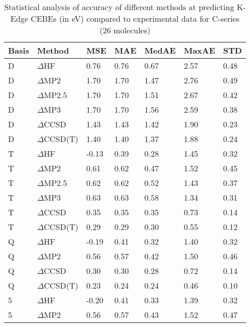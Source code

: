 \begin{table}
  \caption{Statistical analysis of accuracy of different methods at predicting K-Edge CEBEs (in eV) compared to experimental data for C-series (26 molecules)}
  \label{tbl:summary-c}
  \begin{tabular}{l l l l l l l }
    \toprule
    \textbf{Basis} & \textbf{Method} & \textbf{MSE} & \textbf{MAE} & \textbf{MedAE} & \textbf{MaxAE} & \textbf{STD} \\ 
    \midrule
    D & $\Delta$HF & 0.76 & 0.76 & 0.67 & 2.57 & 0.48 \\ 
    D & $\Delta$MP2 & 1.70 & 1.70 & 1.47 & 2.76 & 0.49 \\ 
    D & $\Delta$MP2.5 & 1.70 & 1.70 & 1.51 & 2.67 & 0.42 \\ 
    D & $\Delta$MP3 & 1.70 & 1.70 & 1.56 & 2.59 & 0.38 \\ 
    D & $\Delta$CCSD & 1.43 & 1.43 & 1.42 & 1.90 & 0.23 \\ 
    D & $\Delta$CCSD(T) & 1.40 & 1.40 & 1.37 & 1.88 & 0.24 \\ 
    T & $\Delta$HF & -0.13 & 0.39 & 0.28 & 1.45 & 0.32 \\ 
    T & $\Delta$MP2 & 0.61 & 0.62 & 0.47 & 1.52 & 0.45 \\ 
    T & $\Delta$MP2.5 & 0.62 & 0.62 & 0.52 & 1.43 & 0.37 \\ 
    T & $\Delta$MP3 & 0.63 & 0.63 & 0.58 & 1.34 & 0.31 \\ 
    T & $\Delta$CCSD & 0.35 & 0.35 & 0.35 & 0.73 & 0.14 \\ 
    T & $\Delta$CCSD(T) & 0.29 & 0.29 & 0.30 & 0.55 & 0.12 \\ 
    Q & $\Delta$HF & -0.19 & 0.41 & 0.32 & 1.40 & 0.32 \\ 
    Q & $\Delta$MP2 & 0.56 & 0.57 & 0.42 & 1.50 & 0.46 \\ 
    Q & $\Delta$CCSD & 0.30 & 0.30 & 0.28 & 0.72 & 0.14 \\ 
    Q & $\Delta$CCSD(T) & 0.23 & 0.24 & 0.24 & 0.46 & 0.10 \\ 
    5 & $\Delta$HF & -0.20 & 0.41 & 0.33 & 1.39 & 0.32 \\ 
    5 & $\Delta$MP2 & 0.56 & 0.57 & 0.43 & 1.52 & 0.47 \\ 
    \bottomrule
  \end{tabular}
\end{table}

